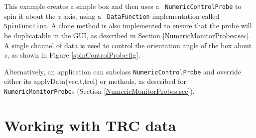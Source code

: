 \lstset{numbers=left}

\lstset{numbers=none}

This example creates a simple box and then uses a {\tt
NumericControlProbe} to spin it about the $z$ axis, using a {\tt
DataFunction} implementation called {\tt SpinFunction}. A clone method
is also implemented to ensure that the probe will be duplicatable in
the GUI, as described in Section \ref{NumericMonitorProbes:sec}.  A
single channel of data is used to control the orientation angle of the
box about $z$, as shown in Figure \ref{spinControlProbe:fig}.

Alternatively, an application can subclass {\tt NumericControlProbe}
and override either its %
{applyData(vec,t,trel)} or 
methods, as described for {\tt NumericMonitorProbe}s (Section
\ref{NumericMonitorProbes:sec}).

%
%

\section{Working with TRC data}
\label{TRCData:sec}

